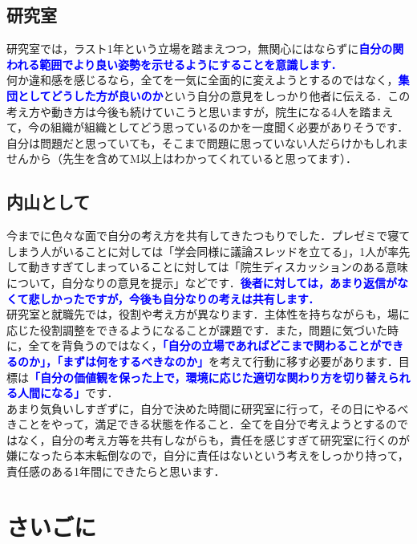 \documentclass[a4paper,12pt]{ltjsarticle}
\newcommand{\important}[1]{\textcolor{blue}{\textbf{#1}}}
\begin{document}
\subsection{研究室}

研究室では，ラスト1年という立場を踏まえつつ，無関心にはならずに\important{自分の関われる範囲でより良い姿勢を示せるようにすることを意識します．}\\

何か違和感を感じるなら，全てを一気に全面的に変えようとするのではなく，\important{集団としてどうした方が良いのか}という自分の意見をしっかり他者に伝える．この考え方や動き方は今後も続けていこうと思いますが，院生になる4人を踏まえて，今の組織が組織としてどう思っているのかを一度聞く必要がありそうです．自分は問題だと思っていても，そこまで問題に思っていない人だらけかもしれませんから（先生を含めてM以上はわかってくれていると思ってます）．

\subsection{内山として}

今までに色々な面で自分の考え方を共有してきたつもりでした．プレゼミで寝てしまう人がいることに対しては「学会同様に議論スレッドを立てる」，1人が率先して動きすぎてしまっていることに対しては「院生ディスカッションのある意味について，自分なりの意見を提示」などです．\important{後者に対しては，あまり返信がなくて悲しかったですが，今後も自分なりの考えは共有します．}\\

研究室と就職先では，役割や考え方が異なります．主体性を持ちながらも，場に応じた役割調整をできるようになることが課題です．また，問題に気づいた時に，全てを背負うのではなく，\important{「自分の立場であればどこまで関わることができるのか」，「まずは何をするべきなのか」}を考えて行動に移す必要があります．目標は\important{「自分の価値観を保った上で，環境に応じた適切な関わり方を切り替えられる人間になる」}です．\\

あまり気負いしすぎずに，自分で決めた時間に研究室に行って，その日にやるべきことをやって，満足できる状態を作ること．全てを自分で考えようとするのではなく，自分の考え方等を共有しながらも，責任を感じすぎて研究室に行くのが嫌になったら本末転倒なので，自分に責任はないという考えをしっかり持って，責任感のある1年間にできたらと思います．
\newpage

\section{さいごに}
\end{document}
